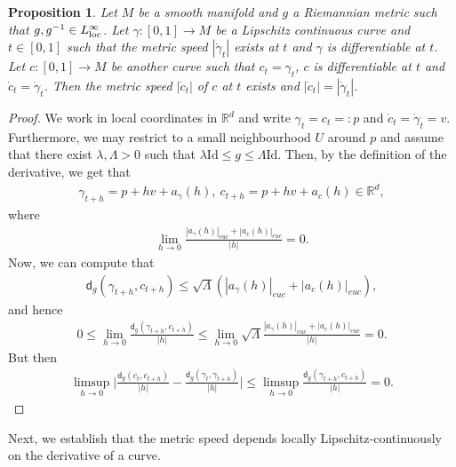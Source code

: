 \documentclass[a4paper,10pt]{article}
\newtheorem{proposition}[theorem]{Proposition}
\numberwithin{equation}{section}
\newcommand{\R}{\mathbb{R}}
\newcommand{\sfd}{\mathsf d}
\begin{document}
 \begin{proposition}\label{metric_speed_depends_on_direction}
 Let $M$ be a smooth manifold and $g$ a Riemannian metric such that $g, g^{-1} \in L^\infty_{\rm loc}$. 
     Let $\gamma:[0,1] \to M$ be a Lipschitz continuous curve and $t\in [0,1]$ such that the metric speed $|\dot{\gamma}_t|$ exists at $t$ and $\gamma$ is differentiable at $t$. Let $c:[0,1] \to M$ be another curve such that $c_t = \gamma_t$, $c$ is differentiable at $t$ and $\dot{c}_t = \dot{\gamma}_t$. Then the metric speed $|\dot{c}_t|$ of $c$ at $t$ exists and $|\dot{c}_t| = |\dot{\gamma}_t|$. 
 \end{proposition}
 \begin{proof}
     We work in local coordinates in $\R^d$ and write $\gamma_t =  c_t =:p$ and  $\dot{c}_t = \dot{\gamma}_t=v$. Furthermore, we may restrict to a small neighbourhood $U$ around $p$ and assume that there exist $\lambda, \Lambda>0$ such that $\lambda \mathrm{Id} \leq g \leq \Lambda \mathrm{Id}$. Then, by the definition of the derivative, we get that 
     \begin{align*}
         \gamma_{t+h} = p + hv + a_{\gamma}(h), \  c_{t+h} = p + hv + a_{c}(h) \in \R^d,
     \end{align*}
     where
     \begin{align}
         \lim_{h \to 0} \frac{|a_{\gamma}(h)|_{euc}+|a_{c}(h)|_{euc}}{|h|} = 0.
     \end{align}
     Now, we can compute that 
     \begin{align}
         \sfd_g(\gamma_{t+h}, c_{t+h}) \leq \sqrt{\Lambda} (|a_{\gamma}(h)|_{euc}+|a_{c}(h)|_{euc}),
     \end{align}
     and hence 
     \begin{align*}
         0 \leq \lim_{h \to 0} \frac{\sfd_g(\gamma_{t+h}, c_{t+h})}{|h|} \leq \lim_{h \to 0} \sqrt{\Lambda} \frac{|a_{\gamma}(h)|_{euc}+|a_{c}(h)|_{euc}}{|h|} =0.
     \end{align*}
     But then 
     \begin{align*}
        \limsup_{h \to 0}\bigg| \frac{\sfd_g(c_t, c_{t+h})}{|h|} -  \frac{\sfd_g(\gamma_t, \gamma_{t+h})}{|h|}\bigg| \leq  \limsup_{h \to 0}  \frac{ \sfd_g(\gamma_{t+h}, c_{t+h})}{|h|} = 0.
     \end{align*}
 \end{proof}
 Next, we establish that the metric speed depends locally Lipschitz-continuously on the derivative of a curve. 
\smallskip
 
\end{document}
